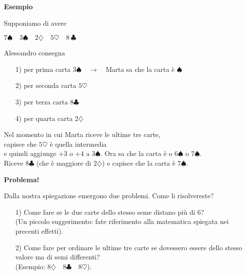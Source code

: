\documentclass[8pt]{beamer}
\theoremstyle{plain}
\theoremstyle{definition}
\begin{document}
\begin{frame}
\begin{center}
\textbf{Esempio}

\medskip
\bigskip

Supponiamo di avere 

\medskip

$7\spadesuit\quad 3\spadesuit\quad 2\diamondsuit\quad 5\heartsuit\quad 8\ \clubsuit$

\medskip
\bigskip


Alessandro consegna

\smallskip

\begin{itemize}
\item[1)] per prima carta $3\spadesuit\quad\longrightarrow\quad$Marta sa che la carta è $\spadesuit$
\item[2)] per seconda carta $5\heartsuit$
\item[3)] per terza carta $8\clubsuit$
\item[4)] per quarta carta $2\diamondsuit$
\end{itemize}

Nel momento in cui Marta riceve le ultime tre carte, \\capisce che $5\heartsuit$ è quella intermedia \\e quindi aggiunge +3 o +4 a $3\spadesuit$. Ora sa che la carta è o $6\spadesuit$ o $7\spadesuit$. \\Riceve $8\clubsuit$ (che è maggiore di $2\diamondsuit$) e capisce che la carta è $7\spadesuit$.
\end{center}
\end{frame}

\begin{frame}
\begin{center}
\textbf{Problema!}

\medskip
\medskip

Dalla nostra spiegazione emergono due problemi. Come li risolvereste? 

\begin{itemize}
\item[1)] Come fare se le due carte dello stesso seme distano più di 6? \\(Un piccolo suggerimento: fate riferimento alla matematica spiegata nei precenti effetti).
\item[2)] Come fare per ordinare le ultime tre carte se dovessero essere dello stesso valore ma di semi differenti? \\(Esempio: $8\diamondsuit\quad 8\clubsuit\quad 8\heartsuit$).
\end{itemize}
\end{center}
\end{frame}
\end{document}
